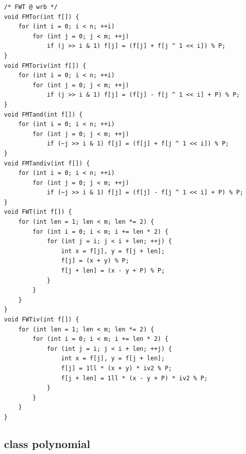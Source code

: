 \documentclass[UTF8, a4paper, titlepage, twoside]{ctexart}
\begin{document}
\begin{lstlisting}[style=cpp]
/* FWT @ wrb */
void FMTor(int f[]) {
    for (int i = 0; i < n; ++i)
        for (int j = 0; j < m; ++j)
            if (j >> i & 1) f[j] = (f[j] + f[j ^ 1 << i]) % P;
}
void FMToriv(int f[]) {
    for (int i = 0; i < n; ++i)
        for (int j = 0; j < m; ++j)
            if (j >> i & 1) f[j] = (f[j] - f[j ^ 1 << i] + P) % P;
}
void FMTand(int f[]) {
    for (int i = 0; i < n; ++i) 
        for (int j = 0; j < m; ++j) 
            if (~j >> i & 1) f[j] = (f[j] + f[j ^ 1 << i]) % P;
}
void FMTandiv(int f[]) {
    for (int i = 0; i < n; ++i)
        for (int j = 0; j < m; ++j)
            if (~j >> i & 1) f[j] = (f[j] - f[j ^ 1 << i] + P) % P;
}
void FWT(int f[]) {
    for (int len = 1; len < m; len *= 2) {
        for (int i = 0; i < m; i += len * 2) {
            for (int j = i; j < i + len; ++j) {
                int x = f[j], y = f[j + len];
                f[j] = (x + y) % P;
                f[j + len] = (x - y + P) % P;
            }
        }
    }
}
void FWTiv(int f[]) {
    for (int len = 1; len < m; len *= 2) {
        for (int i = 0; i < m; i += len * 2) {
            for (int j = i; j < i + len; ++j) {
                int x = f[j], y = f[j + len];
                f[j] = 1ll * (x + y) * iv2 % P;
                f[j + len] = 1ll * (x - y + P) * iv2 % P;
            }
        }
    }
}
\end{lstlisting}


\subsection{ class polynomial }
\end{document}
